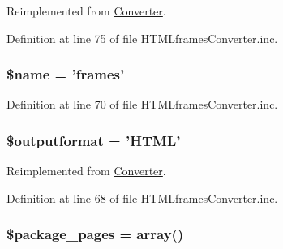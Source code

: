 \-Reimplemented from \hyperlink{class_converter_ab49669c749559bb7833762878adb8f0c}{\-Converter}.



\-Definition at line 75 of file \-H\-T\-M\-Lframes\-Converter.\-inc.

\hypertarget{class_h_t_m_lframes_converter_ab2fc40d43824ea3e1ce5d86dee0d763b}{
\subsubsection[{\$name}]{\setlength{\rightskip}{0pt plus 5cm}\$name = 'frames'}}\label{class_h_t_m_lframes_converter_ab2fc40d43824ea3e1ce5d86dee0d763b}


\-Definition at line 70 of file \-H\-T\-M\-Lframes\-Converter.\-inc.

\hypertarget{class_h_t_m_lframes_converter_af0bfe153c049d957e8ea29b147025108}{
\subsubsection[{\$outputformat}]{\setlength{\rightskip}{0pt plus 5cm}\$outputformat = '\-H\-T\-M\-L'}}\label{class_h_t_m_lframes_converter_af0bfe153c049d957e8ea29b147025108}


\-Reimplemented from \hyperlink{class_converter_af0bfe153c049d957e8ea29b147025108}{\-Converter}.



\-Definition at line 68 of file \-H\-T\-M\-Lframes\-Converter.\-inc.

\hypertarget{class_h_t_m_lframes_converter_acb916db0304b969918dbc0de762d45e0}{
\subsubsection[{\$package\-\_\-pages}]{\setlength{\rightskip}{0pt plus 5cm}\$package\-\_\-pages = array()}}\label{class_h_t_m_lframes_converter_acb916db0304b969918dbc0de762d45e0}



